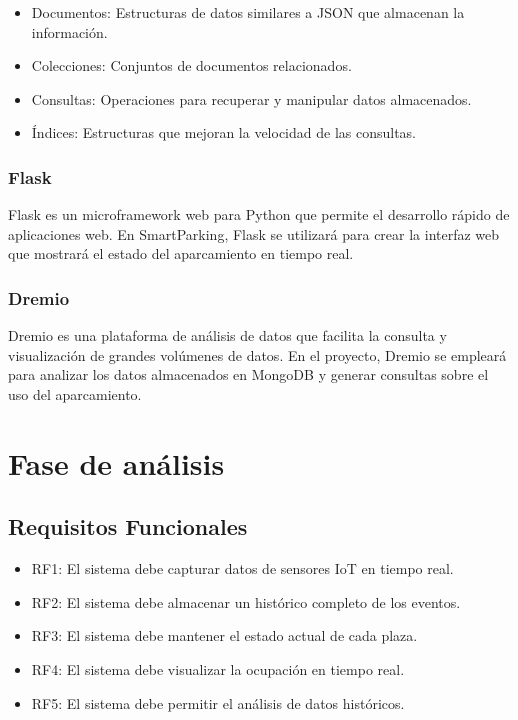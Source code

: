 \documentclass{../../../miPlantilla}
\begin{document}
\begin{itemize}
  \item Documentos: Estructuras de datos similares a JSON que almacenan la información.
  \item Colecciones: Conjuntos de documentos relacionados.
  \item Consultas: Operaciones para recuperar y manipular datos almacenados.
  \item Índices: Estructuras que mejoran la velocidad de las consultas.
\end{itemize}

\subsubsection{Flask}
Flask es un microframework web para Python que permite el desarrollo rápido de aplicaciones web. En SmartParking, Flask se utilizará para crear
la interfaz web que mostrará el estado del aparcamiento en tiempo real.

\subsubsection{Dremio}
Dremio es una plataforma de análisis de datos que facilita la consulta y visualización de grandes volúmenes de datos. En el proyecto,
Dremio se empleará para analizar los datos almacenados en MongoDB y generar consultas sobre el uso del aparcamiento. 

\section{Fase de análisis}
\subsection{Requisitos Funcionales}
\begin{itemize}
  \item RF1: El sistema debe capturar datos de sensores IoT en tiempo real.
  \item RF2: El sistema debe almacenar un histórico completo de los eventos.
  \item RF3: El sistema debe mantener el estado actual de cada plaza.
  \item RF4: El sistema debe visualizar la ocupación en tiempo real.
  \item RF5: El sistema debe permitir el análisis de datos históricos.
\end{itemize}
\end{document}
